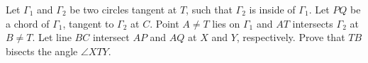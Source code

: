 Let $\Gamma_1$ and $\Gamma_2$ be two circles tangent at $T$,
such that $\Gamma_2$ is inside of $\Gamma_1$.
Let $PQ$ be a chord of $\Gamma_1$, tangent to $\Gamma_2$ at $C$.
Point $A\neq T$ lies on $\Gamma_1$ and $AT$ intersects $\Gamma_2$ at $B \neq T$.
Let line $BC$ intersect $AP$ and $AQ$ at $X$ and $Y$, respectively.
Prove that $TB$ bisects the angle $\angle XTY$.

